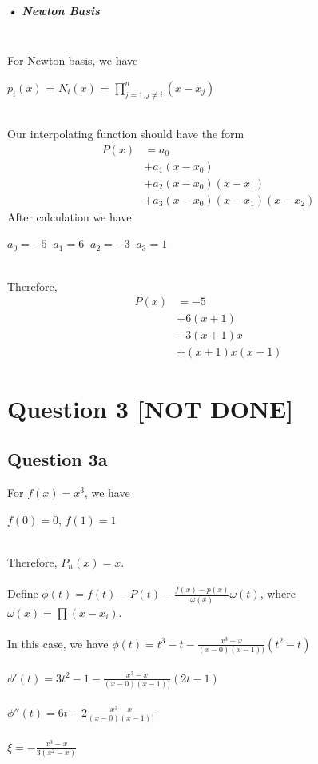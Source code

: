 \documentclass[11pt]{article} %
\begin{document}
\subparagraph{• Newton Basis}\mbox{}\\
For Newton basis, we have\\
\centerline{$p_{i}(x)$ = $N_{i}(x)$ = $\prod_{j=1,j \neq i}^{n}(x-x_{j})$ }\\
Our interpolating function should have the form\\
\begin{equation}
\begin{split}
P(x) &= a_{0}\\
&+a_{1}(x-x_{0})\\
&+a_{2}(x-x_{0})(x-x_{1})\\
&+a_{3}(x-x_{0})(x-x_{1})(x-x_{2})
\end{split}
\end{equation}
After calculation we have:\\
\centerline{$a_{0}=-5\;\;a_{1}=6\;\;a_{2}=-3\;\;a_{3}=1$}\\
Therefore,
\begin{equation}
\begin{split}
P(x) &= -5\\
&+6(x+1)\\
&-3(x+1)x\\
&+(x+1)x(x-1)
\end{split}
\end{equation}
\section{Question 3 [NOT DONE]}
\subsection{Question 3a}
For $f(x) = x^{3}$, we have\\
\centerline{$f(0)=0$, $f(1)=1$}\\
Therefore, $P_{n}(x)=x$.\\\\
Define $\phi(t) = f(t)-P(t)-\frac{f(x)-p(x)}{\omega(x)}\omega(t)$, where $\omega(x) = \prod(x-x_{i})$.\\\\
In this case, we have $\phi(t) = t^{3}-t-\frac{x^{3}-x}{(x-0)(x-1))}(t^{2}-t)$\\\\
$\phi'(t) = 3t^{2}-1-\frac{x^{3}-x}{(x-0)(x-1))}(2t-1)$\\\\
$\phi''(t) = 6t-2\frac{x^{3}-x}{(x-0)(x-1))}$\\\\
$\xi = -\frac{x^3-x}{3(x^2-x)}$
\end{document}
